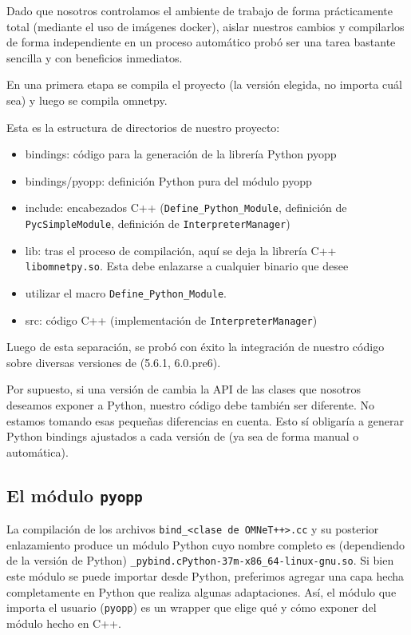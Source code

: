 \documentclass[]{article}
\begin{document}
Dado que nosotros controlamos el ambiente de trabajo de forma prácticamente
total (mediante el uso de imágenes docker), aislar nuestros cambios y
compilarlos de forma independiente en un proceso automático probó ser una tarea
bastante sencilla y con beneficios inmediatos.

En una primera etapa se compila el proyecto \omnetpp{} (la versión elegida, no
importa cuál sea) y luego se compila omnetpy.

Esta es la estructura de directorios de nuestro proyecto:

\begin{itemize}
    \item bindings: código para la generación de la librería Python pyopp

    \item bindings/pyopp: definición Python pura del módulo pyopp

    \item include: encabezados C++ (\verb!Define_Python_Module!, definición de
\verb!PycSimpleModule!, definición de \verb!InterpreterManager!)

    \item lib: tras el proceso de compilación, aquí se deja la librería C++
\verb!libomnetpy.so!. Esta debe enlazarse a cualquier binario que desee
    \item utilizar el macro \verb!Define_Python_Module!.

    \item src: código C++ (implementación de \verb!InterpreterManager!)
\end{itemize}

Luego de esta separación, se probó con éxito la integración de nuestro código
sobre diversas versiones de \omnetpp{} (5.6.1, 6.0.pre6).

Por supuesto, si una versión de \omnetpp{} cambia la API de las clases que
nosotros deseamos exponer a Python, nuestro código debe también ser diferente.
No estamos tomando esas pequeñas diferencias en cuenta. Esto sí obligaría a
generar Python bindings ajustados a cada versión de \omnetpp{} (ya sea de forma
manual o automática).

\subsection{El módulo \texttt{pyopp}}

La compilación de los archivos \verb!bind_<clase de OMNeT++>.cc! y su posterior
enlazamiento produce un módulo Python cuyo nombre completo es (dependiendo de
la versión de Python) \verb!_pybind.cPython-37m-x86_64-linux-gnu.so!. Si bien
este módulo se puede importar desde Python, preferimos agregar una capa hecha
completamente en Python que realiza algunas adaptaciones. Así, el módulo que
importa el usuario (\verb!pyopp!) es un wrapper que elige qué y cómo exponer
del módulo hecho en C++.
\end{document}
